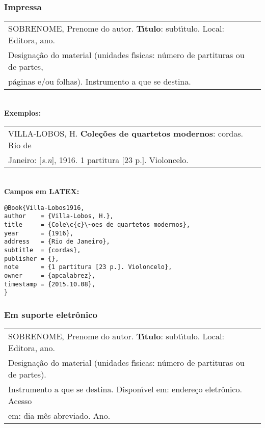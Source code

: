 \subsubsection{Impressa}


\begin{tabular}{|l|c|} \hline
	SOBRENOME, Prenome do autor. \textbf{T\'{\i}tulo}: subt\'{\i}tulo. Local: Editora, ano.\\
	Designa\c{c}\~ao do material (unidades f\'{\i}sicas: n\'umero de partituras ou de partes,\\
	p\'aginas e/ou folhas). Instrumento a que se destina. 
	\\\hline
\end{tabular} \\

\textbf{Exemplos:} \\

\begin{tabular}{|l|c|} \hline
	VILLA-LOBOS, H. \textbf{Cole\c{c}\~oes de quartetos modernos}: cordas. Rio de \\Janeiro: [\textit{s.n}], 1916. 1 partitura [23 p.]. Violoncelo. 
	\\\hline
\end{tabular} \\

\textbf{Campos em LATEX:} 

\begin{verbatim}
@Book{Villa-Lobos1916,
author    = {Villa-Lobos, H.},
title     = {Cole\c{c}\~oes de quartetos modernos},
year      = {1916},
address   = {Rio de Janeiro},
subtitle  = {cordas},
publisher = {},
note      = {1 partitura [23 p.]. Violoncelo},
owner     = {apcalabrez},
timestamp = {2015.10.08},
}
\end{verbatim}

\subsubsection{Em suporte eletr\^onico}

\begin{tabular}{|l|c|} \hline
	SOBRENOME, Prenome do autor. \textbf{T\'{\i}tulo}: subt\'{\i}tulo. Local: Editora,
	ano. \\Designa\c{c}\~ao do material (unidades f\'{\i}sicas: n\'umero de
	partituras ou de partes).\\Instrumento a que se destina. Dispon\'{\i}vel
	em: endere\c{c}o eletr\^onico. Acesso \\em: dia m\^es abreviado. Ano. 
	\\\hline
\end{tabular} \\

